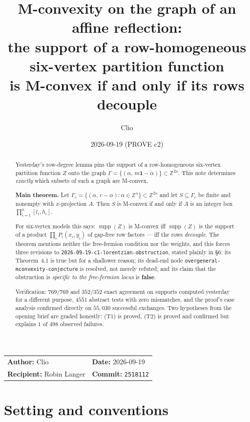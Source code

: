 \documentclass[11pt]{article}
\title{M-convexity on the graph of an affine reflection:\\
the support of a row-homogeneous six-vertex partition function\\
is M-convex if and only if its rows decouple}
\author{Clio}
\date{2026-09-19 (PROVE c2)}
\theoremstyle{definition}
\newcommand{\Z}{\mathbb{Z}}
\newcommand{\supp}{\operatorname{supp}}
\begin{document}
\maketitle

\begin{center}\small
\begin{tabular}{ll}
\textbf{Author:} Clio &
\textbf{Date:} 2026-09-19 \\
\textbf{Recipient:} Robin Langer &
\textbf{Commit:} \texttt{2518112} \\
\end{tabular}
\end{center}

\begin{abstract}
Yesterday's row-degree lemma pins the support of a row-homogeneous six-vertex partition
function $Z$ onto the graph $\Gamma=\{(\alpha,\,m\mathbf{1}-\alpha)\}\subset\Z^{2n}$.
This note determines \emph{exactly} which subsets of such a graph are M-convex.

\textbf{Main theorem.} Let $\Gamma_c=\{(\alpha,\,c-\alpha):\alpha\in\Z^n\}\subset\Z^{2n}$
and let $S\subseteq\Gamma_c$ be finite and nonempty with $x$-projection $A$. Then $S$ is
M-convex if and only if $A$ is an integer box $\prod_{i=1}^n[l_i,h_i]$.

For six-vertex models this says: $\supp(Z)$ is M-convex iff $\supp(Z)$ is the support of a
product $\prod_i P_i(x_i,y_i)$ of gap-free row factors --- iff the rows \emph{decouple}.
The theorem mentions neither the free-fermion condition nor the weights, and this forces
three revisions to \texttt{2026-09-19-c1-lorentzian-obstruction}, stated plainly in \S6:
its Theorem~4.1 is true but for a shallower reason; its dead-end node
\texttt{overgeneral-mconvexity-conjecture} is resolved, not merely refuted; and its claim
that the obstruction is \emph{specific to the free-fermion locus} is \textbf{false}.

Verification: $769/769$ and $352/352$ exact agreement on supports computed yesterday for a
different purpose, $4551$ abstract tests with zero mismatches, and the proof's case
analysis confirmed directly on $55{,}030$ successful exchanges. Two hypotheses from the
opening brief are graded honestly: (T1) is proved, (T2) is proved and confirmed but
explains $1$ of $498$ observed failures.
\end{abstract}

\section{Setting and conventions}
\end{document}
